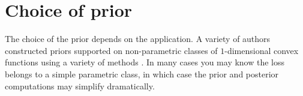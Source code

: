 \documentclass[letter, 12pt]{report}
\newcommand{\1}{\mathbf{1}}
\theoremstyle{plain}
\theoremstyle{definition}
\theoremstyle{remark}
\begin{document}
\section{Choice of prior} The choice of the prior depends on the application. A variety of authors constructed priors supported on non-parametric
classes of $1$-dimensional convex functions
using a variety of methods \citep{ramgopal1993nonparametric,chang2007shape,shively2011nonparametric}.
In many cases you may know the loss belongs to a simple parametric class, in which case the prior and posterior computations may simplify dramatically.

\end{document}
